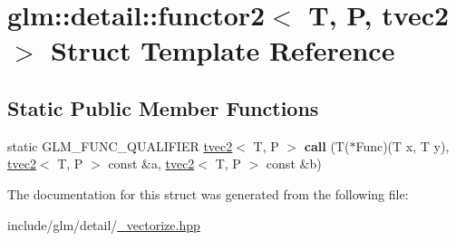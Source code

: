 \hypertarget{structglm_1_1detail_1_1functor2_3_01T_00_01P_00_01tvec2_01_4}{}\section{glm\+:\+:detail\+:\+:functor2$<$ T, P, tvec2 $>$ Struct Template Reference}
\label{structglm_1_1detail_1_1functor2_3_01T_00_01P_00_01tvec2_01_4}
\subsection*{Static Public Member Functions}
\begin{DoxyCompactItemize}
\item 
\mbox{\label{structglm_1_1detail_1_1functor2_3_01T_00_01P_00_01tvec2_01_4_a3f747eea2648beb35126086723c1797f}} 
static G\+L\+M\+\_\+\+F\+U\+N\+C\+\_\+\+Q\+U\+A\+L\+I\+F\+I\+ER \hyperlink{structglm_1_1tvec2}{tvec2}$<$ T, P $>$ {\bfseries call} (T($\ast$Func)(T x, T y), \hyperlink{structglm_1_1tvec2}{tvec2}$<$ T, P $>$ const \&a, \hyperlink{structglm_1_1tvec2}{tvec2}$<$ T, P $>$ const \&b)
\end{DoxyCompactItemize}


The documentation for this struct was generated from the following file\+:\begin{DoxyCompactItemize}
\item 
include/glm/detail/\hyperlink{__vectorize_8hpp}{\+\_\+vectorize.\+hpp}\end{DoxyCompactItemize}

